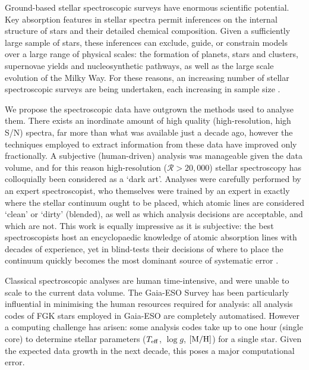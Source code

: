 \documentclass[useAMS,usenatbib]{mn2e}
\newcommand\teff{$T_{\rm eff}$}
\newcommand\logg{$\log{g}$}
\newcommand\mh{${\rm [M/H]}$}
\begin{document}
Ground-based stellar spectroscopic surveys have enormous scientific potential.
  Key absorption features in stellar spectra permit inferences on the internal 
structure of stars and their detailed chemical composition.  Given a sufficiently
large sample of stars, these inferences can exclude, guide, or constrain models 
over a large range of physical scales: the formation of planets, stars and 
clusters, supernovae yields and nucleosynthetic pathways, as well as the large 
scale evolution of the Milky Way.  For these reasons, an increasing number of 
stellar spectroscopic surveys are being undertaken, each 
increasing in sample size \citep{gaia_eso, galah, lamost, apogee, weave, 4most}.

We propose the spectroscopic data have outgrown the methods used to analyse
them. There exists an inordinate amount of high quality (high-resolution, high S/N)
spectra, far more than what was available just a decade ago, however the techniques 
employed to extract information from these data have improved only fractionally. 
A subjective (human-driven) analysis was manageable given the data volume, and 
for this reason high-resolution ($\mathcal{R} > 20,000$) stellar spectroscopy has 
colloquially been considered as a `dark art'. Analyses were carefully performed 
by an expert spectroscopist, who themselves were trained by an expert in exactly
where the stellar continuum ought to be placed, which atomic lines are 
considered `clean' or `dirty' (blended), as well as which analysis decisions are
acceptable, and which are not. This work is equally impressive as it is 
subjective: the best spectroscopists host an encyclopaedic knowledge of atomic
absorption lines with decades of experience, yet in blind-tests their decisions 
of where to place the continuum quickly becomes the most dominant source of 
systematic error \citep{who, who}.

Classical spectroscopic analyses are human time-intensive, and were unable to
scale to the current data volume. The Gaia-ESO Survey has been particularly 
influential in minimising the human resources required for analysis: all analysis 
codes of FGK stars employed in Gaia-ESO are completely automatised.  However
a computing challenge has arisen: some analysis codes take up to one hour (single
core) to determine stellar parameters (\teff, \logg, \mh) for a single star. Given the 
expected data growth in the next decade, this poses a major computational error.
\end{document}
